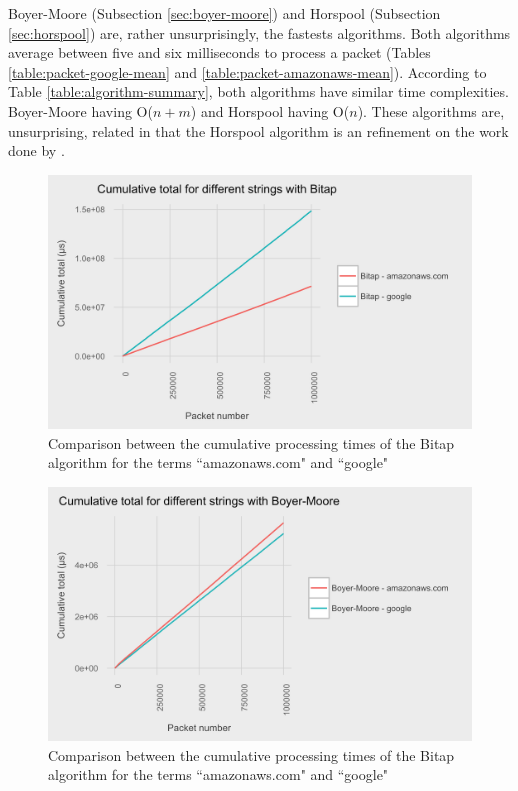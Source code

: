 \documentclass{article}
\begin{document}
Boyer-Moore \citep{Boyer1977} (Subsection \ref{sec:boyer-moore}) and Horspool \citep{Horspool1980} (Subsection \ref{sec:horspool}) are, rather unsurprisingly, the fastests algorithms. Both algorithms average between five and six milliseconds to process a packet (Tables \ref{table:packet-google-mean} and \ref{table:packet-amazonaws-mean}). According to Table \ref{table:algorithm-summary}, both algorithms have similar time complexities. Boyer-Moore having O(\(n+m\)) and Horspool having O(\(n\)). These algorithms are, unsurprising, related in that the Horspool algorithm is an refinement on the work done by \cite{Boyer1977}.

\begin{figure}[h!bt]
  \centering
  \includegraphics[width=\textwidth]{graphs/term_length_compare-bitap.png}
  \caption{Comparison between the cumulative processing times of the Bitap algorithm for the terms ``amazonaws.com" and ``google"}
\end{figure}

\begin{figure}[h!bt]
  \centering
  \includegraphics[width=\textwidth]{graphs/term_length_compare-boyer-moore.png}
  \caption{Comparison between the cumulative processing times of the Bitap algorithm for the terms ``amazonaws.com" and ``google"}
\end{figure}
\end{document}

